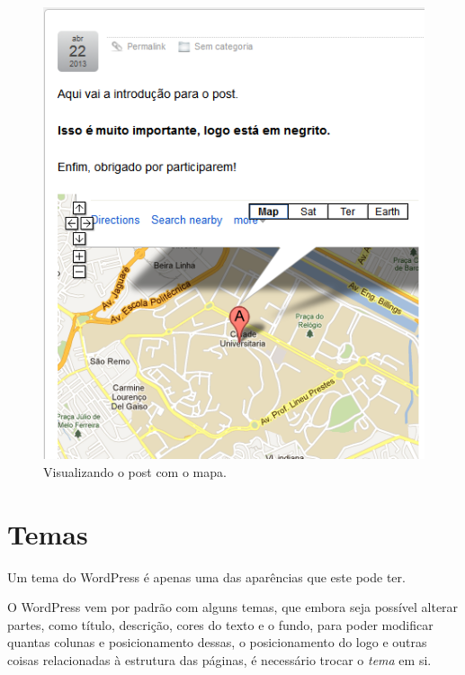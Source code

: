 \documentclass[12pt,onecolumn]{article}
\begin{document}
\begin{enumerate}
\begin{figure}[H]
						\includegraphics{html5.png}
						\caption{Visualizando o post com o mapa.}
					\end{figure}
			\end{enumerate}

\clearpage
\section{Temas}
	Um tema do WordPress é apenas uma das aparências que este pode ter. 

	O WordPress vem por padrão com alguns temas, que embora seja possível alterar partes, 
	como título, descrição, cores do texto e o fundo, para poder modificar quantas colunas
	e posicionamento dessas, o posicionamento do logo e outras coisas relacionadas à estrutura 
	das páginas, é necessário trocar o \textit{tema} em si.
	
	
\end{document}
